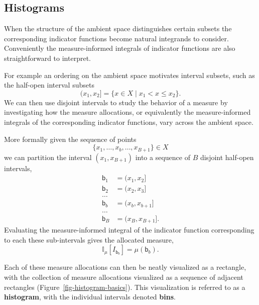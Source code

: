 \documentclass[
  letterpaper,
  DIV=11,
  numbers=noendperiod]{scrartcl}
\begin{document}
\hypertarget{histograms}{%
\subsection{Histograms}\label{histograms}}

When the structure of the ambient space distinguishes certain subsets
the corresponding indicator functions become natural integrands to
consider. Conveniently the measure-informed integrals of indicator
functions are also straightforward to interpret.

For example an ordering on the ambient space motivates interval subsets,
such as the half-open interval subsets \[
( x_{1}, x_{2} ] = \{ x \in X \mid x_{1} < x \le x_{2} \}.
\] We can then use disjoint intervals to study the behavior of a measure
by investigating how the measure allocations, or equivalently the
measure-informed integrals of the corresponding indicator functions,
vary across the ambient space.

More formally given the sequence of points \[
\{ x_{1}, \ldots, x_{b}, \ldots, x_{B + 1} \} \in X
\] we can partition the interval \((x_{1}, x_{B + 1})\) into a sequence
of \(B\) disjoint half-open intervals, \begin{align*}
\mathsf{b}_{1} &= ( x_{1}, x_{2} ]
\\
\mathsf{b}_{2} &= ( x_{2}, x_{3} ]
\\
\ldots&
\\
\mathsf{b}_{b} &= ( x_{b}, x_{b + 1} ]
\\
\ldots&
\\
\mathsf{b}_{B} &= ( x_{B}, x_{B + 1} ].
\end{align*} Evaluating the measure-informed integral of the indicator
function corresponding to each these sub-intervals gives the allocated
measure, \[
\mathbb{I}_{\mu}[I_{\mathsf{b}_{b}}]
= \mu(\mathsf{b}_{b}).
\]

Each of these measure allocations can then be neatly visualized as a
rectangle, with the collection of measure allocations visualized as a
sequence of adjacent rectangles (Figure~\ref{fig-histogram-basics}).
This visualization is referred to as a \textbf{histogram}, with the
individual intervals denoted \textbf{bins}.
\end{document}

